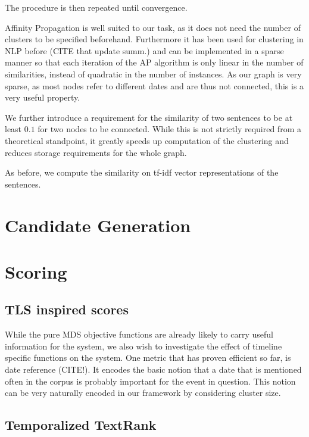 \documentclass[a4paper,BCOR=10mm]{report}
\begin{document}
The procedure is then repeated until convergence.

Affinity Propagation is well suited to our task, as it does not need the number of clusters to be specified beforehand. Furthermore it has been used for clustering in NLP before (CITE that update summ.) and can be implemented in a sparse manner so that each iteration of the AP algorithm is only linear in the number of similarities, instead of quadratic in the number of instances.
As our graph is very sparse, as most nodes refer to different dates and are thus not connected, this is a very useful property.

We further introduce a requirement for the similarity of two sentences to be at least $0.1$ for two nodes to be connected. While this is not strictly required from a theoretical standpoint, it greatly speeds up computation of the clustering and reduces storage requirements for the whole graph.

As before, we compute the similarity on tf-idf vector representations of the sentences.

\section{Candidate Generation}

\section{Scoring} \label{sec:scoring}

\subsection{TLS inspired scores} \label{sec:tls-scores}

While the pure MDS objective functions are already likely to carry useful information for the system, we also wish to investigate the effect of timeline specific functions on the system.
One metric that has proven efficient so far, is date reference (CITE!). It encodes the basic notion that a date that is mentioned often in the corpus is probably important for the event in question.
This notion can be very naturally encoded in our framework by considering cluster size. %

\subsection{Temporalized TextRank}
\end{document}

